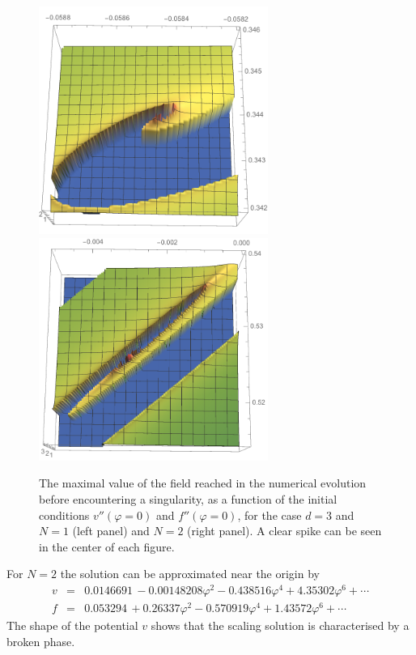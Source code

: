 \documentclass[a4paper,11pt]{revtex4}
\newcommand{\bea}{\begin{eqnarray}}
\newcommand{\eea}{\end{eqnarray}}
\begin{document}
\begin{figure}
\includegraphics[width=7.5cm]{spike_d3N1.pdf}
\
\includegraphics[width=7.5cm]{spike_d3N2.pdf}
\caption{The maximal value of the field reached in the numerical
evolution before encountering a singularity, as a function 
of the initial conditions $v''(\varphi=0)$ and $f''(\varphi=0)$,
for the case $d=3$ and $N=1$ (left panel) and $N=2$ (right panel).
A clear spike can be seen in the center of each figure.
}
\label{WFN1N2}
\end{figure}

For $N=2$ the solution can be approximated near the origin by
\bea
v&=&0.0146691\, -0.00148208 \varphi ^2-0.438516 \varphi ^4+4.35302 \varphi ^6+\cdots
\nonumber \\
f&=&0.053294\, +0.26337 \varphi ^2-0.570919 \varphi ^4+1.43572 \varphi ^6+\cdots
\nonumber
\eea
The shape of the potential $v$ shows that the scaling solution is characterised by a broken phase.
\end{document}
